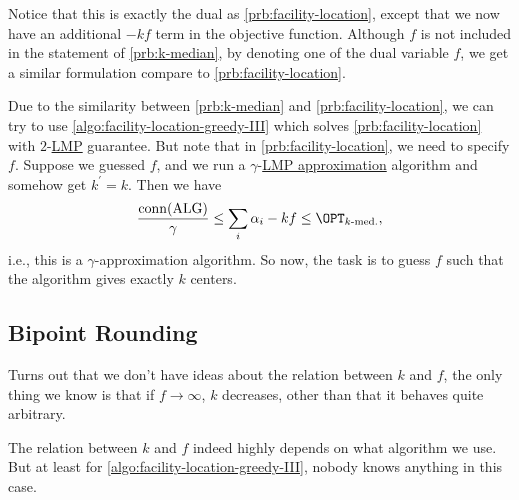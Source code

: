 \begin{note}
	Notice that this is exactly the dual as \autoref{prb:facility-location}, except that we now have an additional \(-kf\) term in the objective function. Although \(f\) is not included in the statement of \autoref{prb:k-median}, by denoting one of the dual variable \(f\), we get a similar formulation compare to \autoref{prb:facility-location}.
\end{note}

Due to the similarity between \autoref{prb:k-median} and \autoref{prb:facility-location}, we can try to use \autoref{algo:facility-location-greedy-III} which solves \autoref{prb:facility-location} with \(2\)-\hyperref[def:LMP]{LMP} guarantee. But note that in \autoref{prb:facility-location}, we need to specify \(f\). Suppose we guessed \(f\), and we run a \(\gamma\)-\hyperref[def:LMP]{LMP approximation} algorithm and somehow get \(k^\prime = k\). Then we have
\[
	\frac{\mathop{\mathrm{conn}}(\mathrm{ALG})}{\gamma } \leq \sum_{i} \alpha _i - kf \leq \OPT_{\text{\(k\)-med.}},
\]
i.e., this is a \(\gamma \)-approximation algorithm. So now, the task is to guess \(f\) such that the algorithm gives exactly \(k\) centers.

\subsection{Bipoint Rounding}
Turns out that we don't have ideas about the relation between \(k\) and \(f\), the only thing we know is that if \(f\to \infty \), \(k\) decreases, other than that it behaves quite arbitrary.

\begin{remark}
	The relation between \(k\) and \(f\) indeed highly depends on what algorithm we use. But at least for \autoref{algo:facility-location-greedy-III}, nobody knows anything in this case.
\end{remark}

